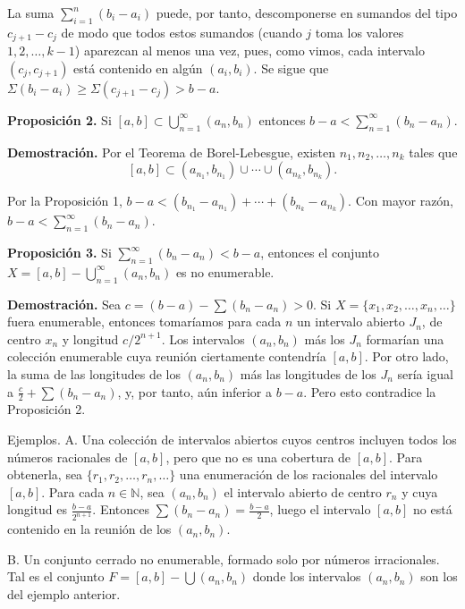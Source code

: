 \documentclass[12pt,oneside]{book}
\begin{document}
La suma \(\sum_{i=1}^n (b_i - a_i)\) puede, por tanto, descomponerse en sumandos del tipo \(c_{j+1} - c_j\) de modo que todos estos sumandos (cuando \(j\) toma los valores \(1, 2, \ldots, k-1\)) aparezcan al menos una vez, pues, como vimos, cada intervalo \((c_j, c_{j+1})\) está contenido en algún \((a_i, b_i)\). Se sigue que \(\Sigma(b_i - a_i) \geq \Sigma(c_{j+1} - c_j) > b - a\).

\textbf{Proposición 2.} Si \([a, b] \subset \bigcup_{n=1}^\infty (a_n, b_n)\) entonces \(b - a < \sum_{n=1}^\infty (b_n - a_n)\).

\textbf{Demostración.} Por el Teorema de Borel-Lebesgue, existen \(n_1, n_2, \ldots, n_k\) tales que
\[
[a, b] \subset (a_{n_1}, b_{n_1}) \cup \cdots \cup (a_{n_k}, b_{n_k}).
\]

Por la Proposición 1, \(b - a < (b_{n_1} - a_{n_1}) + \cdots + (b_{n_k} - a_{n_k})\). Con mayor razón, \(b - a < \sum_{n=1}^\infty (b_n - a_n)\).

\textbf{Proposición 3.} Si \(\sum_{n=1}^{\infty} (b_n - a_n) < b - a\), entonces el conjunto \(X = [a, b] - \bigcup_{n=1}^{\infty} (a_n, b_n)\) es no enumerable.

\textbf{Demostración.} Sea \(c = (b - a) - \sum (b_n - a_n) > 0\). Si \(X = \{x_1, x_2, \dots, x_n, \dots\}\) fuera enumerable, entonces tomaríamos para cada \(n\) un intervalo abierto \(J_n\), de centro \(x_n\) y longitud \(c/2^{n+1}\). Los intervalos \((a_n, b_n)\) más los \(J_n\) formarían una colección enumerable cuya reunión ciertamente contendría \([a, b]\). Por otro lado, la suma de las longitudes de los \((a_n, b_n)\) más las longitudes de los \(J_n\) sería igual a \(\frac{c}{2} + \sum (b_n - a_n)\), y, por tanto, aún inferior a \(b - a\). Pero esto contradice la Proposición 2.

Ejemplos. A. Una colección de intervalos abiertos cuyos centros incluyen todos los números racionales de \([a, b]\), pero que no es una cobertura de \([a, b]\). Para obtenerla, sea \(\{r_1, r_2, \dots, r_n, \dots\}\) una enumeración de los racionales del intervalo \([a, b]\). Para cada \(n \in \mathbb{N}\), sea \((a_n, b_n)\) el intervalo abierto de centro \(r_n\) y cuya longitud es \(\frac{b - a}{2^{n+1}}\). Entonces \(\sum (b_n - a_n) = \frac{b - a}{2}\), luego el intervalo \([a, b]\) no está contenido en la reunión de los \((a_n, b_n)\).

B. Un conjunto cerrado no enumerable, formado solo por números irracionales. Tal es el conjunto \(F = [a, b] - \bigcup (a_n, b_n)\) donde los intervalos \((a_n, b_n)\) son los del ejemplo anterior.
\end{document}

